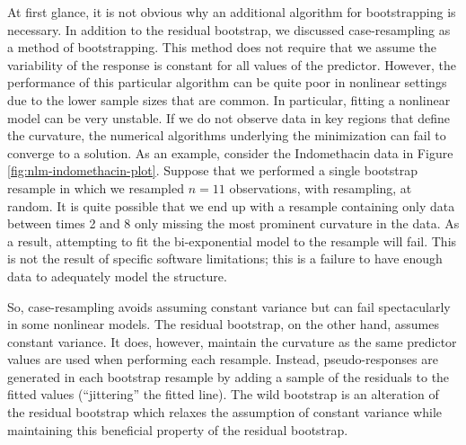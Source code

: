 \documentclass[
]{book}
\theoremstyle{plain}
\theoremstyle{mydefn}
\theoremstyle{myexmpl}
\theoremstyle{remark}
\begin{document}
At first glance, it is not obvious why an additional algorithm for bootstrapping is necessary. In addition to the residual bootstrap, we discussed case-resampling as a method of bootstrapping. This method does not require that we assume the variability of the response is constant for all values of the predictor. However, the performance of this particular algorithm can be quite poor in nonlinear settings due to the lower sample sizes that are common. In particular, fitting a nonlinear model can be very unstable. If we do not observe data in key regions that define the curvature, the numerical algorithms underlying the minimization can fail to converge to a solution. As an example, consider the Indomethacin data in Figure \ref{fig:nlm-indomethacin-plot}. Suppose that we performed a single bootstrap resample in which we resampled \(n = 11\) observations, with resampling, at random. It is quite possible that we end up with a resample containing only data between times 2 and 8 only missing the most prominent curvature in the data. As a result, attempting to fit the bi-exponential model to the resample will fail. This is not the result of specific software limitations; this is a failure to have enough data to adequately model the structure.

So, case-resampling avoids assuming constant variance but can fail spectacularly in some nonlinear models. The residual bootstrap, on the other hand, assumes constant variance. It does, however, maintain the curvature as the same predictor values are used when performing each resample. Instead, pseudo-responses are generated in each bootstrap resample by adding a sample of the residuals to the fitted values (``jittering'' the fitted line). The wild bootstrap is an alteration of the residual bootstrap which relaxes the assumption of constant variance while maintaining this beneficial property of the residual bootstrap.
\end{document}
